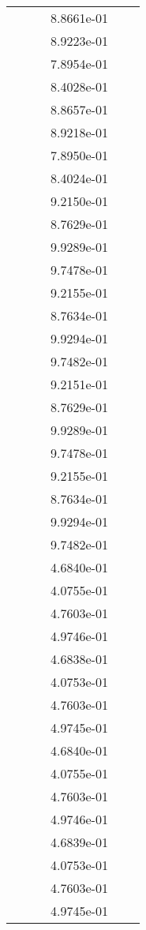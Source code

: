 \begin{xltabular}{\textwidth}{r|rS[table-format=1.3e+2]S[table-format=1.4e+2]S[table-format=1.4e+2]S[table-format=-1.5]}
&  &  & 8.8661e-01 & & \\
&  &  & 8.9223e-01 & & \\
&  &  & 7.8954e-01 & & \\
&  &  & 8.4028e-01 & & \\
&  &  & 8.8657e-01 & & \\
&  &  & 8.9218e-01 & & \\
&  &  & 7.8950e-01 & & \\
&  &  & 8.4024e-01 & & \\
&  &  & 9.2150e-01 & & \\
&  &  & 8.7629e-01 & & \\
&  &  & 9.9289e-01 & & \\
&  &  & 9.7478e-01 & & \\
&  &  & 9.2155e-01 & & \\
&  &  & 8.7634e-01 & & \\
&  &  & 9.9294e-01 & & \\
&  &  & 9.7482e-01 & & \\
&  &  & 9.2151e-01 & & \\
&  &  & 8.7629e-01 & & \\
&  &  & 9.9289e-01 & & \\
&  &  & 9.7478e-01 & & \\
&  &  & 9.2155e-01 & & \\
&  &  & 8.7634e-01 & & \\
&  &  & 9.9294e-01 & & \\
&  &  & 9.7482e-01 & & \\
&  &  & 4.6840e-01 & & \\
&  &  & 4.0755e-01 & & \\
&  &  & 4.7603e-01 & & \\
&  &  & 4.9746e-01 & & \\
&  &  & 4.6838e-01 & & \\
&  &  & 4.0753e-01 & & \\
&  &  & 4.7603e-01 & & \\
&  &  & 4.9745e-01 & & \\
&  &  & 4.6840e-01 & & \\
&  &  & 4.0755e-01 & & \\
&  &  & 4.7603e-01 & & \\
&  &  & 4.9746e-01 & & \\
&  &  & 4.6839e-01 & & \\
&  &  & 4.0753e-01 & & \\
&  &  & 4.7603e-01 & & \\
&  &  & 4.9745e-01 & & \\

\end{xltabular}
